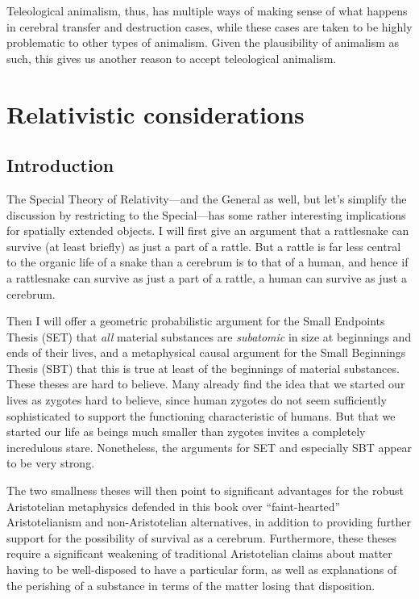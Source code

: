 Teleological animalism, thus, has multiple ways of making sense of what happens in cerebral transfer and destruction cases, while these cases
are taken to be highly problematic to other types of animalism. Given the plausibility of animalism as such, this gives us another reason to accept
teleological animalism.

\section{Relativistic considerations}
\subsection{Introduction}
The Special Theory of Relativity---and the General as well, but let's simplify the discussion by restricting to 
the Special---has some rather interesting implications for spatially extended objects. I will first give an argument
that a rattlesnake can survive (at least briefly) as just a part of a rattle. But a rattle is far less central to the organic
life of a snake than a cerebrum is to that of a human, and hence if a rattlesnake can survive as just a part of a rattle, a human
can survive as just a cerebrum. 

Then I will offer a geometric probabilistic argument for the Small Endpoints Thesis 
(SET) that \textit{all} material substances are \textit{subatomic} in size at beginnings and ends of their lives, 
and a metaphysical causal argument for the Small Beginnings Thesis (SBT) that this is true at least of the 
beginnings of material substances. These theses are hard to believe. Many already find the idea that we started 
our lives as zygotes hard to believe, since human zygotes do not seem sufficiently sophisticated to support the 
functioning characteristic of humans. But that we started our life as beings much smaller than zygotes invites 
a completely incredulous stare. Nonetheless, the arguments for SET and especially SBT appear to be very strong.

The two smallness theses will then point to significant advantages for the robust Aristotelian metaphysics defended 
in this book over ``faint-hearted'' Aristotelianism and non-Aristotelian alternatives, in addition to providing
further support for the possibility of survival as a cerebrum. Furthermore, these theses require a significant 
weakening of traditional Aristotelian claims about matter having to be well-disposed to have a particular form, 
as well as explanations of the perishing of a substance in terms of the matter losing that disposition. 

